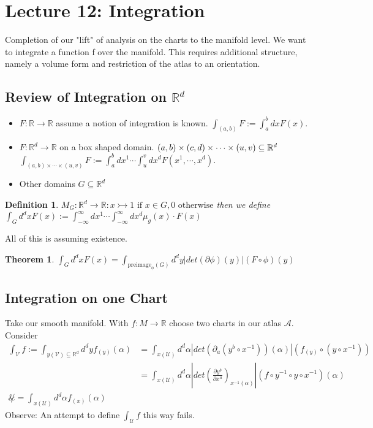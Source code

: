 \documentclass[10pt, oneside]{article}
\newcommand{\R}{\mathbb{R}}
\newtheorem{thm}{Theorem}
\newtheorem{defn}{Definition}
\begin{document}
\section{Lecture 12: Integration \cite{IntMan}}
Completion of our "lift" of analysis on the charts to the manifold level. We want to integrate a function f over the manifold. This requires additional structure, namely a volume form and restriction of the atlas to an orientation.
\subsection{Review of Integration on $\R^d$}
\begin{itemize}
  \item $F: \R \to \R$ assume a notion of integration is known. $\int_{(a,b)} F := \int_{a}^{b} dx F(x)$.
  \item $F: \R^d \to \R$ on a box shaped domain. $(a,b) \times (c,d) \times \cdots \times (u,v) \subseteq \R^d \\$
   $\int_{(a,b) \times \cdots \times (u,v)} F := \int_{a}^b dx^1 \cdots \int_{u}^v dx^d F(x^1, \cdots, x^d)$.
  \item Other domains $G \subseteq \R^d$
\end{itemize}
\begin{defn}
$M_G: \R^d \to \R: x \rightarrowtail {1 \text{ if } x \in G, 0 \text{ otherwise}}$ then we define $\int_G d^d x F(x) := \int_{-\infty}^{\infty} dx^1 \cdots \int_{-\infty}^{\infty}dx^d \mu_g (x) \cdot F(x)$
\end{defn}
All of this is assuming existence.
\begin{thm}
$\int_G d^d x F(x) = \int_{\text{preimage}_\phi(G)}d^d y |det(\partial \phi)(y) | (F \circ \phi )(y)$
\end{thm}
\subsection{Integration on one Chart}
Take our smooth manifold. With $f: M \to \R$ choose two charts in our atlas $\mathcal{A}$. Consider
\begin{align*}
\int_\mathcal{V} f:= \int_{y(\mathcal{V}) \subseteq \R^d} d^d y f_{(y)} (\alpha) &= \int_{x(\mathcal{U})} d^d \alpha |det(\partial_a (y^b \circ x^{-1})) (\alpha)|(f_{(y)} \circ (y \circ x^{-1})) \\
&= \int_{x(\mathcal{U})} d^d \alpha |det (\frac{\partial y^b}{\partial x^a})_{x^{-1}(\alpha)}| (f \circ y^{-1} \circ y \circ x^{-1})(\alpha) \\
\not &= \int_{x(\mathcal{U})} d^d \alpha f_{(x)}(\alpha)
\end{align*}
Observe: An attempt to define $\int_\mathcal{U} f $ this way fails.
\end{document}
